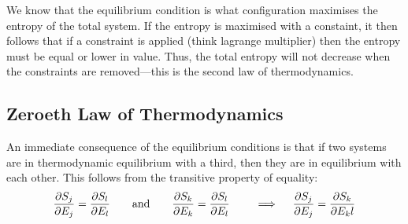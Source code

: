 \begin{aside}
We know that the equilibrium condition is what configuration maximises the entropy of the total system. If the entropy is maximised with a constaint, it then follows that if a constraint is applied (think lagrange multiplier) then the entropy must be equal or lower in value. Thus, the total entropy will not decrease when the constraints are removed---this is the second law of thermodynamics.
\end{aside}

\subsection{Zeroeth Law of Thermodynamics}
An immediate consequence of the equilibrium conditions is that if two systems are in thermodynamic equilibrium with a third, then they are in equilibrium with each other. This follows from the transitive property of equality:
\begin{equation}
	\frac{\partial S_j}{\partial E_j} = \frac{\partial S_l}{\partial E_l} 
	\qquad
	\text{and}
	\qquad
	\frac{\partial S_k}{\partial E_k} = \frac{\partial S_l}{\partial E_l} 
\qquad
\implies \quad
	\frac{\partial S_j}{\partial E_j} = \frac{\partial S_k}{\partial E_kl} 
\end{equation}
